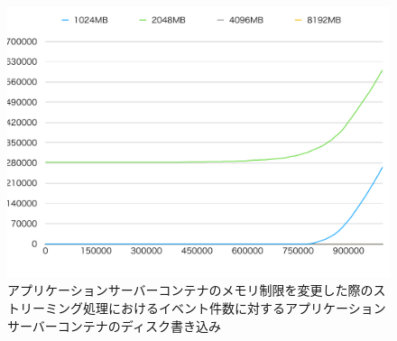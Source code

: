 \documentclass[../../../../../main]{subfiles}
\begin{document}
    \begin{figure}[H]
        \centering
        \includegraphics[width=12cm]{graph}
        \caption{アプリケーションサーバーコンテナのメモリ制限を変更した際のストリーミング処理におけるイベント件数に対するアプリケーションサーバーコンテナのディスク書き込み}
        \label{fig:stream-change-app-memory-limit-app-disk-in-app_4_db_1_1024}
    \end{figure}
\end{document}
